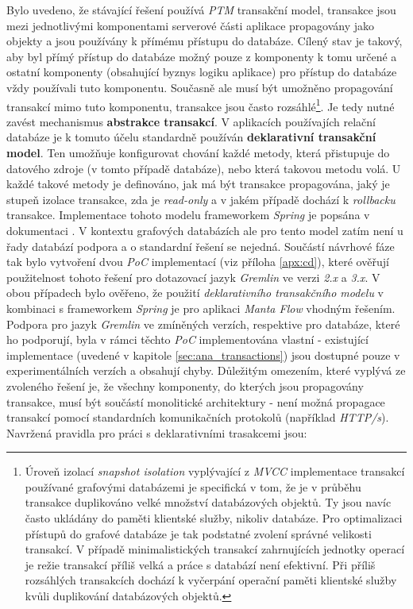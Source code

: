 Bylo uvedeno, že stávající řešení používá \textit{PTM} transakční model, transakce jsou mezi jednotlivými komponentami serverové části aplikace propagovány jako objekty a jsou používány k přímému přístupu do databáze. Cílený stav je takový, aby byl přímý přístup do databáze možný pouze z komponenty k tomu určené a ostatní komponenty (obsahující byznys logiku aplikace) pro přístup do databáze vždy používali tuto komponentu. Současně ale musí být umožněno propagování transakcí mimo tuto komponentu, transakce jsou často rozsáhlé\footnote{Úroveň izolací \textit{snapshot isolation} vyplývající z \textit{MVCC} implementace transakcí používané grafovými databázemi je specifická v tom, že je v průběhu transakce duplikováno velké množství databázových objektů. Ty jsou navíc často ukládány do paměti klientské služby, nikoliv databáze. Pro optimalizaci přístupů do grafové databáze je tak podstatné zvolení správné velikosti transakcí. V případě minimalistických transakcí zahrnujících jednotky operací je režie transakcí příliš velká a práce s databází není efektivní. Při příliš rozsáhlých transakcích dochází k vyčerpání operační paměti klientské služby kvůli duplikování databázových objektů.}. Je tedy nutné zavést mechanismus \textbf{abstrakce transakcí}.
V aplikacích používajích relační databáze je k tomuto účelu standardně používán \textbf{deklarativní transakční model}. Ten umožňuje konfigurovat chování každé metody, která přistupuje do datového zdroje (v tomto případě databáze), nebo která takovou metodu volá. U každé takové metody je definováno, jak má být transakce propagována, jaký je stupeň izolace transakce, zda je \textit{read-only} a v jakém případě dochází k \textit{rollbacku} transakce. Implementace tohoto modelu frameworkem \textit{Spring} je popsána v dokumentaci \cite{SpringTransactions}.
V kontextu grafových databázích ale pro tento model zatím není u řady databází podpora a o standardní řešení se nejedná. Součástí návrhové fáze tak bylo vytvoření dvou \textit{PoC} implementací (viz příloha \ref{apx:cd}), které ověřují použitelnost tohoto řešení pro dotazovací jazyk \textit{Gremlin} ve verzi \textit{2.x} a \textit{3.x}. V obou případech bylo ověřeno, že použití \textit{deklarativního transakčního modelu} v kombinaci s frameworkem \textit{Spring} je pro aplikaci \textit{Manta Flow} vhodným řešením. Podpora pro jazyk \textit{Gremlin} ve zmíněných verzích, respektive pro databáze, které ho podporují, byla v rámci těchto \textit{PoC} implementována vlastní - existující implementace (uvedené v kapitole \ref{sec:ana_transactions}) jsou dostupné pouze v experimentálních verzích a obsahují chyby.
Důležitým omezením, které vyplývá ze zvoleného řešení je, že všechny komponenty, do kterých jsou propagovány transakce, musí být součástí monolitické architektury - není možná propagace transakcí pomocí standardních komunikačních protokolů (například \textit{HTTP/s}). Navržená pravidla pro práci s deklarativními trasakcemi jsou:

